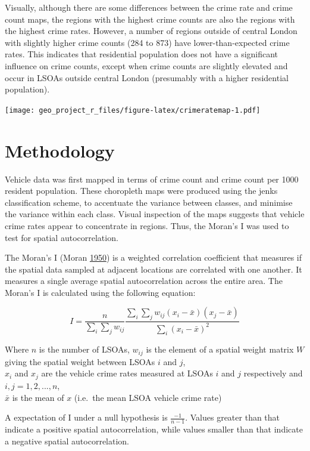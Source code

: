 \documentclass[]{article}
\theoremstyle{definition}
\theoremstyle{definition}
\theoremstyle{definition}
\theoremstyle{remark}
\begin{document}
Visually, although there are some differences between the crime rate and
crime count maps, the regions with the highest crime counts are also the
regions with the highest crime rates. However, a number of regions
outside of central London with slightly higher crime counts (284 to 873)
have lower-than-expected crime rates. This indicates that residential
population does not have a significant influence on crime counts, except
when crime counts are slightly elevated and occur in LSOAs outside
central London (presumably with a higher residential population).

\texttt{[image: geo\_project\_r\_files/figure-latex/crimeratemap-1.pdf]}
\pagebreak

\section{Methodology}\label{methodology}

Vehicle data was first mapped in terms of crime count and crime count
per 1000 resident population. These choropleth maps were produced using
the jenks classification scheme, to accentuate the variance between
classes, and minimise the variance within each class. Visual inspection
of the maps suggests that vehicle crime rates appear to concentrate in
regions. Thus, the Moran's I was used to test for spatial
autocorrelation.

The Moran's I (Moran \protect\hyperlink{ref-Moran1950}{1950}) is a
weighted correlation coefficient that measures if the spatial data
sampled at adjacent locations are correlated with one another. It
measures a single average spatial autocorrelation across the entire
area. The Moran's I is calculated using the following equation:

\[I=\frac{n} {\sum_{i}\sum_{j}w_{ij}} \frac{\sum_{i}\sum_{j}w_{ij}(x_i-\bar{x})(x_j-\bar{x})} {\sum_{i}(x_i-\bar{x})^2}\]

Where \(n\) is the number of LSOAs, \(w_{ij}\) is the element of a
spatial weight matrix \(W\) giving the spatial weight between LSOAs
\(i\) and \(j\),\\
\(x_i\) and \(x_j\) are the vehicle crime rates measured at LSOAs \(i\)
and \(j\) respectively and \(i,j=1,2,...,n\),\\
\(\bar{x}\) is the mean of \(x\) (i.e.~the mean LSOA vehicle crime rate)

A expectation of I under a null hypothesis is \(\frac{-1} {n-1}\).
Values greater than that indicate a positive spatial autocorrelation,
while values smaller than that indicate a negative spatial
autocorrelation.
\end{document}
